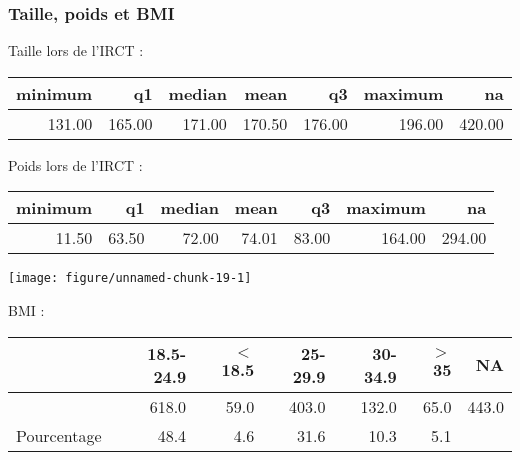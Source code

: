 \documentclass[11pt,a4paper]{article}\usepackage[]{graphicx}\usepackage[]{color}
\makeatletter
\def\maxwidth{ %
  \ifdim\Gin@nat@width>\linewidth
    \linewidth
  \else
    \Gin@nat@width
  \fi
}
\newenvironment{knitrout}{}{} %
\makeatother
\begin{document}
    \subsubsection{Taille, poids et BMI}
  
Taille lors de l'IRCT :
  
\begin{table}[ht]
\centering
\begin{tabular}{rrrrrrr}
  \hline
minimum & q1 & median & mean & q3 & maximum & na \\ 
  \hline
131.00 & 165.00 & 171.00 & 170.50 & 176.00 & 196.00 & 420.00 \\ 
   \hline
\end{tabular}
\end{table}


Poids lors de l'IRCT :

\begin{table}[ht]
\centering
\begin{tabular}{rrrrrrr}
  \hline
minimum & q1 & median & mean & q3 & maximum & na \\ 
  \hline
11.50 & 63.50 & 72.00 & 74.01 & 83.00 & 164.00 & 294.00 \\ 
   \hline
\end{tabular}
\end{table}


\begin{knitrout}
\color{fgcolor}
\texttt{[image: figure/unnamed-chunk-19-1]} 

\end{knitrout}


BMI :

\begin{table}[H]
\centering
\begin{tabular}{rrrrrrr}
  \hline
 & 18.5-24.9 & $<$18.5 & 25-29.9 & 30-34.9 & $>$35 & NA \\ 
  \hline
 & 618.0 & 59.0 & 403.0 & 132.0 & 65.0 & 443.0 \\ 
  Pourcentage & 48.4 & 4.6 & 31.6 & 10.3 & 5.1 &  \\ 
   \hline
\end{tabular}
\end{table}
\end{document}
